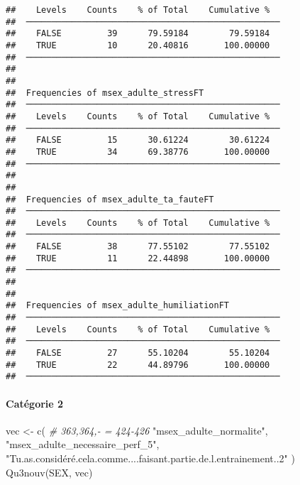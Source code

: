 \documentclass[
]{article}
\newenvironment{Shaded}{\begin{snugshade}}{\end{snugshade}}
\newcommand{\CommentTok}[1]{\textcolor[rgb]{0.56,0.35,0.01}{\textit{#1}}}
\newcommand{\FunctionTok}[1]{\textcolor[rgb]{0.00,0.00,0.00}{#1}}
\newcommand{\NormalTok}[1]{#1}
\newcommand{\OtherTok}[1]{\textcolor[rgb]{0.56,0.35,0.01}{#1}}
\newcommand{\StringTok}[1]{\textcolor[rgb]{0.31,0.60,0.02}{#1}}
\begin{document}
\begin{verbatim}
##    Levels    Counts    % of Total    Cumulative %   
##  ────────────────────────────────────────────────── 
##    FALSE         39      79.59184        79.59184   
##    TRUE          10      20.40816       100.00000   
##  ────────────────────────────────────────────────── 
## 
## 
##  Frequencies of msex_adulte_stressFT                
##  ────────────────────────────────────────────────── 
##    Levels    Counts    % of Total    Cumulative %   
##  ────────────────────────────────────────────────── 
##    FALSE         15      30.61224        30.61224   
##    TRUE          34      69.38776       100.00000   
##  ────────────────────────────────────────────────── 
## 
## 
##  Frequencies of msex_adulte_ta_fauteFT              
##  ────────────────────────────────────────────────── 
##    Levels    Counts    % of Total    Cumulative %   
##  ────────────────────────────────────────────────── 
##    FALSE         38      77.55102        77.55102   
##    TRUE          11      22.44898       100.00000   
##  ────────────────────────────────────────────────── 
## 
## 
##  Frequencies of msex_adulte_humiliationFT           
##  ────────────────────────────────────────────────── 
##    Levels    Counts    % of Total    Cumulative %   
##  ────────────────────────────────────────────────── 
##    FALSE         27      55.10204        55.10204   
##    TRUE          22      44.89796       100.00000   
##  ──────────────────────────────────────────────────
\end{verbatim}

\hypertarget{catuxe9gorie-2-4}{%
\paragraph{Catégorie 2}\label{catuxe9gorie-2-4}}

\begin{Shaded}
\begin{Highlighting}[]
\NormalTok{vec }\OtherTok{\textless{}{-}} \FunctionTok{c}\NormalTok{(  }\CommentTok{\# 363,364,{-} = 424{-}426}
  \StringTok{"msex\_adulte\_normalite"}\NormalTok{,}
  \StringTok{"msex\_adulte\_necessaire\_perf\_5"}\NormalTok{,}
  \StringTok{"Tu.as.considéré.cela.comme....faisant.partie.de.l.entrainement..2"}
\NormalTok{)}
\FunctionTok{Qu3nouv}\NormalTok{(SEX, vec)}
\end{Highlighting}
\end{Shaded}
\end{document}
